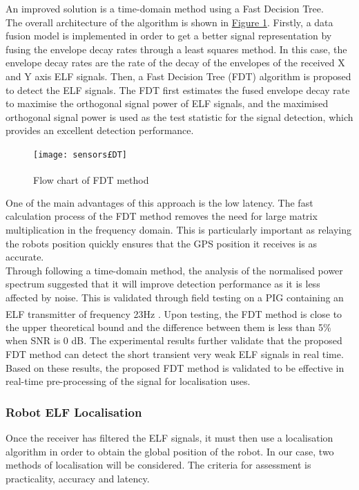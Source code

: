 \documentclass[11pt]{article}		%
\newcommand{\supercite}[1]{\textsuperscript{\cite{#1}}}		%
\newcommand{\figref}[1]{\hyperref[#1]{Figure \ref*{#1}}}    %
\begin{document}
			An improved solution is a time-domain method using a Fast Decision Tree. 
			\\
	    	\hspace*{3ex}The overall architecture of the algorithm is shown in \figref{FDTFlowchart}. 
	    	Firstly, a data fusion model is implemented in order to get a better signal representation by fusing the envelope decay rates through a least squares method. 
	    	In this case, the envelope decay rates are the rate of the decay of the envelopes of the received X and Y axis ELF signals. 
	    	Then, a Fast Decision Tree (FDT) algorithm is proposed to detect the ELF signals. 
	    	The FDT first estimates the fused envelope decay rate to maximise the orthogonal signal power of ELF signals, and the maximised orthogonal signal power is used as the test statistic for the signal detection, which provides an excellent detection performance.
	        
	         \begin{figure}[h]
				\centering
				\texttt{[image: sensors£DT]}
				\caption{Flow chart of FDT method \supercite{FDT}}
				\label{FDTFlowchart}
			\end{figure}
			
			One of the main advantages of this approach is the low latency. 
			The fast calculation process of the FDT method removes the need for large matrix multiplication in the frequency domain. 
			This is particularly important as relaying the robots position quickly ensures that the GPS position it receives is as accurate. 
			\\
	    	\hspace*{3ex}Through following a time-domain method, the analysis of the normalised power spectrum suggested that it will improve detection performance as it is less affected by noise. 
	    	This is validated through field testing on a PIG containing an ELF transmitter of frequency 23Hz \supercite{FDT}. 
	    	Upon testing, the FDT method is close to the upper theoretical bound and the difference between them is less than 5\%  when SNR is 0 dB.
	    	The experimental results further validate that the proposed FDT method can detect the short transient very weak ELF signals in real time. 
	    	Based on these results, the proposed FDT method is validated to be effective in real-time pre-processing of the signal for localisation uses.
			
			\subsubsection{Robot ELF Localisation} \label{elfLocalisation}
			Once the receiver has filtered the ELF signals, it must then use a localisation algorithm in order to obtain the global position of the robot. In our case, two methods of localisation will be considered. The criteria for assessment is practicality, accuracy and latency. 
			
\end{document}
